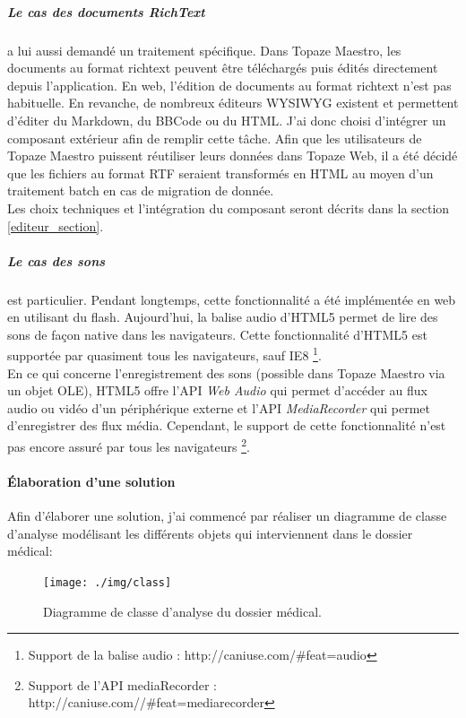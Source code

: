 \subparagraph*{Le cas des documents RichText} a lui aussi demandé un traitement spécifique. Dans Topaze Maestro, les documents au format richtext peuvent être téléchargés puis édités directement depuis l'application. En web, l'édition de documents au format richtext n'est pas habituelle. En revanche, de nombreux éditeurs \gls{WYSIWYG} existent et permettent d'éditer du Markdown, du BBCode ou du HTML. J'ai donc choisi d'intégrer un composant extérieur afin de remplir cette tâche. Afin que les utilisateurs de Topaze Maestro puissent réutiliser leurs données dans Topaze Web, il a été décidé que les fichiers au format RTF seraient transformés en HTML au moyen d'un traitement batch en cas de migration de donnée. \\
Les choix techniques et l'intégration du composant seront décrits dans la section \ref{editeur_section}.

\subparagraph*{Le cas des sons} est particulier. Pendant longtemps, cette fonctionnalité a été implémentée en web en utilisant du flash. Aujourd'hui, la balise audio d'HTML5 permet de lire des sons de façon native dans les navigateurs. Cette fonctionnalité d'HTML5 est supportée par quasiment tous les navigateurs, sauf IE8 \footnote{Support de la balise audio : http://caniuse.com/\#feat=audio}. \\
En ce qui concerne l'enregistrement des sons (possible dans Topaze Maestro via un objet OLE), HTML5 offre l'API \textit{Web Audio}\cite{bib:webaudio} qui permet d'accéder au flux audio ou vidéo d'un périphérique externe et l'API \textit{MediaRecorder}\cite{bib:mediarecorder} qui permet d'enregistrer des flux média. Cependant, le support de cette fonctionnalité n'est pas encore assuré par tous les navigateurs \footnote{Support de l'API mediaRecorder : http://caniuse.com//\#feat=mediarecorder}. 

\paragraph{Élaboration d'une solution\\}
Afin d'élaborer une solution, j'ai commencé par réaliser un diagramme de classe d'analyse modélisant les différents objets qui interviennent dans le dossier médical:

\begin{figure}[H]
  \centering
  \texttt{[image: ./img/class]}
  \caption{\label{fig:mb_va_ast} Diagramme de classe d'analyse du dossier médical.}
\end{figure}

